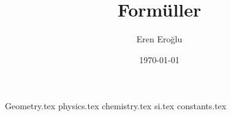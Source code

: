 \documentclass[a4paper, 10pt]{report}
\author{Eren Eroğlu}
\date{\today}
\title{Formüller}
\newcommand{\refresh}{
    \pagestyle{fancy}
    \fancyhf{}
    \lhead{\thepage}
}
\begin{document}
    \newtheorem*{theorem}{Teori}
    \theoremstyle{definition}
    \newtheorem*{definition}{Tanım}
    \refresh
    \maketitle
    \tableofcontents
    {Geometry.tex}
    {physics.tex}
    {chemistry.tex}
    {si.tex}
    {constants.tex}
\end{document}
